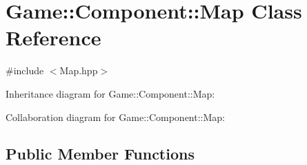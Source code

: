 \hypertarget{class_game_1_1_component_1_1_map}{}\section{Game\+:\+:Component\+:\+:Map Class Reference}
\label{class_game_1_1_component_1_1_map}


{\ttfamily \#include $<$Map.\+hpp$>$}



Inheritance diagram for Game\+:\+:Component\+:\+:Map\+:


Collaboration diagram for Game\+:\+:Component\+:\+:Map\+:
\subsection*{Public Member Functions}
